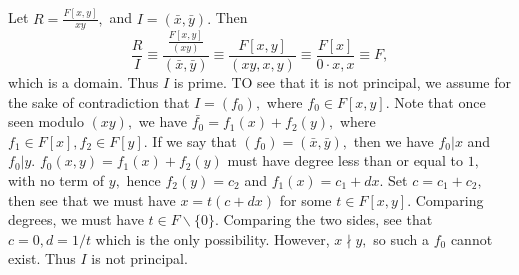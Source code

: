 \documentclass{article}
\begin{document}
\section{} %
Let $R=\frac{F[x,y]}{xy},$ and $I=(\bar{x},\bar{y}).$ Then $$\frac{R}{I} \equiv \frac{\frac{F[x,y]}{(xy)}}{(\bar{x},\bar{y})} \equiv \frac{F[x,y]}{(xy,x,y)} \equiv \frac{F[x]}{0 \cdot x,x} \equiv F,$$ which is a domain. Thus $I$ is prime. TO see that it is not principal, we assume for the sake of contradiction that $I=(f_0),$ where $f_0 \in F[x,y].$ Note that once seen modulo $(xy),$ we have $\bar{f_0}=f_1(x)+f_2(y),$ where $f_1 \in F[x], f_2 \in F[y].$ If we say that $(f_0)=(\bar{x},\bar{y}),$ then we have $f_0 | x$ and $f_0 | y.$ $f_0(x,y)=f_1(x)+f_2(y)$ must have degree less than  or equal to $1,$ with no term of $y,$ hence $f_2(y)=c_2$ and $f_1(x)=c_1+dx.$ Set $c=c_1+c_2,$ then see that we must have $x=t(c+dx)$ for some $t \in F[x,y].$ Comparing degrees, we must have $t \in F \backslash \{0\}.$ Comparing the two sides, see that $c=0, d=1/t$ which is the only possibility. However, $x \nmid y,$ so such a $f_0$ cannot exist. Thus $I$ is not principal.

 
\end{document}
